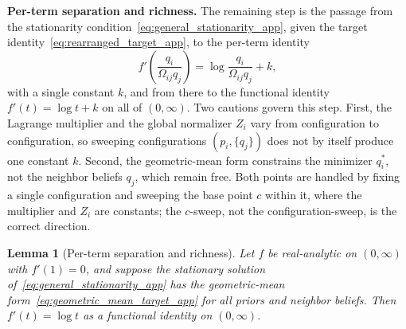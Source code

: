 \documentclass[11pt]{article}
\newtheorem{lemma}{Lemma}
\begin{document}
\textbf{Per-term separation and richness.} The remaining step is the passage from the stationarity condition~\eqref{eq:general_stationarity_app}, given the target identity~\eqref{eq:rearranged_target_app}, to the per-term identity
\begin{equation}
f'\left(\frac{q_i}{\Omega_{ij}q_j}\right) = \log\frac{q_i}{\Omega_{ij}q_j} + k,
\label{eq:ode_app}
\end{equation}
with a single constant $k$, and from there to the functional identity $f'(t) = \log t + k$ on all of $(0, \infty)$. Two cautions govern this step. First, the Lagrange multiplier and the global normalizer $Z_i$ vary from configuration to configuration, so sweeping configurations $(p_i, \{q_j\})$ does not by itself produce one constant $k$. Second, the geometric-mean form constrains the minimizer $q_i^*$, not the neighbor beliefs $q_j$, which remain free. Both points are handled by fixing a single configuration and sweeping the base point $c$ within it, where the multiplier and $Z_i$ are constants; the $c$-sweep, not the configuration-sweep, is the correct direction.

\begin{lemma}[Per-term separation and richness]
\label{lem:richness_app}
Let $f$ be real-analytic on $(0, \infty)$ with $f'(1) = 0$, and suppose the stationary solution of~\eqref{eq:general_stationarity_app} has the geometric-mean form~\eqref{eq:geometric_mean_target_app} for all priors and neighbor beliefs. Then $f'(t) = \log t$ as a functional identity on $(0, \infty)$.
\end{lemma}
\end{document}
